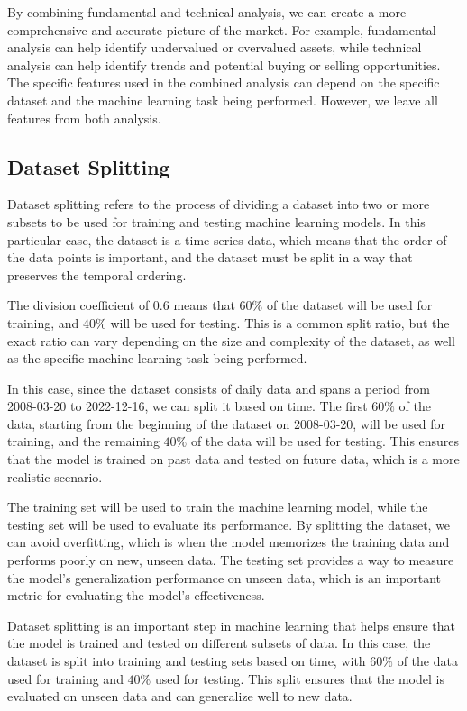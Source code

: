 \documentclass[../xlapes02]{subfiles}
\begin{document}
    By combining fundamental and technical analysis, we can create a more comprehensive and accurate picture of the market. For example, fundamental analysis can help identify undervalued or overvalued assets, while technical analysis can help identify trends and potential buying or selling opportunities. The specific features used in the combined analysis can depend on the specific dataset and the machine learning task being performed. However, we leave all features from both analysis.

    \subsection{Dataset Splitting}\label{subsec:dataset-splitting}
    Dataset splitting refers to the process of dividing a dataset into two or more subsets to be used for training and testing machine learning models. In this particular case, the dataset is a time series data, which means that the order of the data points is important, and the dataset must be split in a way that preserves the temporal ordering.

    The division coefficient of $0.6$ means that $60\%$ of the dataset will be used for training, and $40\%$ will be used for testing. This is a common split ratio, but the exact ratio can vary depending on the size and complexity of the dataset, as well as the specific machine learning task being performed.

    In this case, since the dataset consists of daily data and spans a period from 2008-03-20 to 2022-12-16, we can split it based on time. The first $60\%$ of the data, starting from the beginning of the dataset on 2008-03-20, will be used for training, and the remaining $40\%$ of the data will be used for testing. This ensures that the model is trained on past data and tested on future data, which is a more realistic scenario.

    The training set will be used to train the machine learning model, while the testing set will be used to evaluate its performance. By splitting the dataset, we can avoid overfitting, which is when the model memorizes the training data and performs poorly on new, unseen data. The testing set provides a way to measure the model's generalization performance on unseen data, which is an important metric for evaluating the model's effectiveness.

    Dataset splitting is an important step in machine learning that helps ensure that the model is trained and tested on different subsets of data. In this case, the dataset is split into training and testing sets based on time, with $60\%$ of the data used for training and $40\%$ used for testing. This split ensures that the model is evaluated on unseen data and can generalize well to new data.
\end{document}
